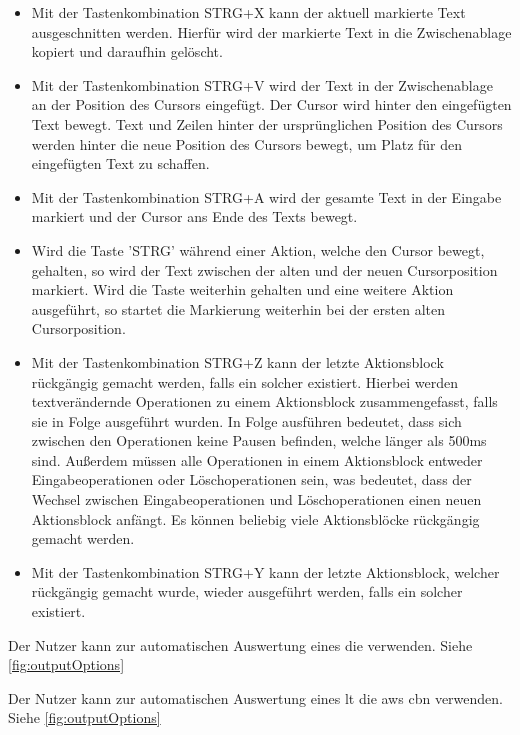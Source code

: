\documentclass[parskip=full,11pt,twoside]{scrartcl}
\begin{document}
\begin{itemize}
	\item Mit der Tastenkombination STRG+X kann der aktuell markierte Text ausgeschnitten werden. Hierfür wird der markierte Text in die Zwischenablage kopiert und daraufhin gelöscht.
	\item Mit der Tastenkombination STRG+V wird der Text in der Zwischenablage an der Position des Cursors eingefügt. Der Cursor wird hinter den eingefügten Text bewegt. Text und Zeilen hinter der ursprünglichen Position des Cursors werden hinter die neue Position des Cursors bewegt, um Platz für den eingefügten Text zu schaffen.
	\item Mit der Tastenkombination STRG+A wird der gesamte Text in der Eingabe markiert und der Cursor ans Ende des Texts bewegt.
	\item Wird die Taste 'STRG' während einer Aktion, welche den Cursor bewegt, gehalten, so wird der Text zwischen der alten und der neuen Cursorposition markiert. Wird die Taste weiterhin gehalten und eine weitere Aktion ausgeführt, so startet die Markierung weiterhin bei der ersten alten Cursorposition.
	\item Mit der Tastenkombination STRG+Z kann der letzte Aktionsblock rückgängig gemacht werden, falls ein solcher existiert. 
	Hierbei werden textverändernde Operationen zu einem Aktionsblock zusammengefasst, falls sie in Folge ausgeführt wurden. In Folge ausführen bedeutet, dass sich zwischen den Operationen keine Pausen befinden, welche länger als 500ms sind. Außerdem müssen alle Operationen in einem Aktionsblock entweder Eingabeoperationen oder Löschoperationen sein, was bedeutet, dass der Wechsel zwischen Eingabeoperationen und Löschoperationen einen neuen Aktionsblock anfängt.
	Es können beliebig viele Aktionsblöcke rückgängig gemacht werden.
	\item Mit der Tastenkombination STRG+Y kann der letzte Aktionsblock, welcher rückgängig gemacht wurde, wieder ausgeführt werden, falls ein solcher existiert.
\end{itemize}


Der Nutzer kann zur automatischen Auswertung eines  die  verwenden. Siehe \cref{fig:outputOptions}

Der Nutzer kann zur automatischen Auswertung eines \gls{lt} die \gls{aws} \gls{cbn} verwenden. Siehe \cref{fig:outputOptions}
\end{document}
